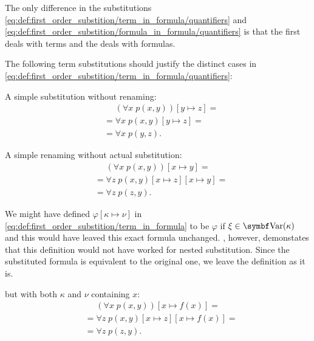 \begin{definition}
\begin{DefEnum}
    The only difference in the substitutions \eqref{eq:def:first_order_substition/term_in_formula/quantifiers} and \eqref{eq:def:first_order_substition/formula_in_formula/quantifiers} is that the first deals with terms and the deals with formulas.
  \end{DefEnum}
\end{definition}

\begin{example}\label{ex:first_order_substition}
  The following term substitutions should justify the distinct cases in \eqref{eq:def:first_order_substition/term_in_formula/quantifiers}:
  \begin{ExEnum}
     A simple substitution without renaming:
    \begin{align*}
      &{}\phantom{=}{}
      (\forall x\; p(x, y))[y \mapsto z]
      = \\ &=
      \forall x\; p(x, y)[y \mapsto z]
      = \\ &=
      \forall x\; p(y, z).
    \end{align*}

     A simple renaming without actual substitution:
    \begin{align*}
      &{}\phantom{=}{}
      (\forall x\; p(x, y))[x \mapsto y]
      = \\ &=
      \forall z\; p(x, y)[x \mapsto z][x \mapsto y]
      = \\ &=
      \forall z\; p(z, y).
    \end{align*}

    We might have defined \( \varphi[\kappa \mapsto \nu] \) in \eqref{eq:def:first_order_substition/term_in_formula} to be \( \varphi \) if \( \xi \in \Bold{Var}(\kappa) \) and this would have leaved this exact formula unchanged. , however, demonstates that this definition would not have worked for nested substitution. Since the substituted formula is equivalent to the original one, we leave the definition as it is.

      but with both \( \kappa \) and \( \nu \) containing \( x \):
    \begin{align*}
      &{}\phantom{=}{}
      (\forall x\; p(x, y))[x \mapsto f(x)]
      = \\ &=
      \forall z\; p(x, y)[x \mapsto z][x \mapsto f(x)]
      = \\ &=
      \forall z\; p(z, y).
    \end{align*}


\end{ExEnum}
\end{example}
